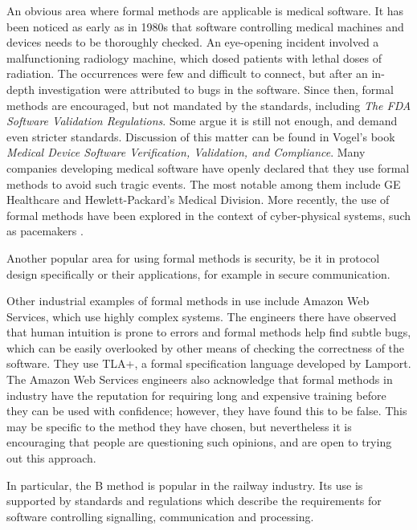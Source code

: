 \documentclass[12pt,journal,duplex]{IEEEtran}
\begin{document}
	An obvious area where formal methods are applicable is medical software. It has been noticed as early as in 1980s that software controlling medical machines and devices needs to be thoroughly checked. An eye-opening incident involved a malfunctioning radiology machine, which dosed patients with lethal doses of radiation. The occurrences were few and difficult to connect, but after an in-depth investigation were attributed to bugs in the software\cite{therac}. Since then, formal methods are encouraged, but not mandated by the standards, including \emph{The FDA Software Validation Regulations}\cite{FDA}. Some argue it is still not enough, and demand even stricter standards. Discussion of this matter can be found in Vogel's book \emph{Medical Device Software Verification, Validation, and Compliance}\cite{vogel}. Many companies developing medical software have openly declared that they use formal methods to avoid such tragic events. The most notable among them include GE Healthcare\cite{ge} and Hewlett-Packard's Medical Division\cite{hp}. More recently, the use of formal methods have been explored in the context of cyber-physical systems\cite{cyber_physical}, such as pacemakers \cite{pacemaker_kwiatkowska3}.

	Another popular area for using formal methods is security, be it in protocol design specifically\cite{security} or their applications, for example in secure communication\cite{security2}.

	Other industrial examples of formal methods in use include Amazon Web Services, which use highly complex systems\cite{amazon}. The engineers there have observed that human intuition is prone to errors and formal methods help find subtle bugs, which can be easily overlooked by other means of checking the correctness of the software. They use TLA+, a formal specification language developed by Lamport\cite{TLA}. The Amazon Web Services engineers also acknowledge that formal methods in industry have the reputation for requiring long and expensive training before they can be used with confidence; however, they have found this to be false. This may be specific to the method they have chosen, but nevertheless it is encouraging that people are questioning such opinions, and are open to trying out this approach.

	In particular, the B method is popular in the railway industry. Its use is supported by standards and regulations which describe the requirements for software controlling signalling, communication and processing\cite{railway standard}.
\end{document}
